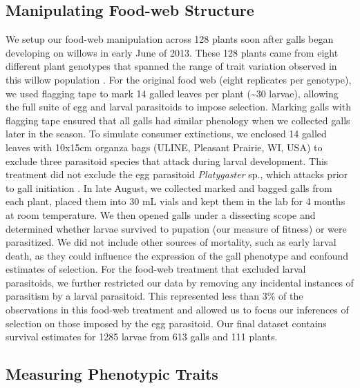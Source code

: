 \documentclass[11pt,]{article}
\begin{document}
\subsection{Manipulating Food-web
Structure}\label{manipulating-food-web-structure}

We setup our food-web manipulation across 128 plants soon after galls
began developing on willows in early June of 2013. These 128 plants came
from eight different plant genotypes that spanned the range of trait
variation observed in this willow population \citep{Barbour2015}. For
the original food web (eight replicates per genotype), we used flagging
tape to mark 14 galled leaves per plant (\textasciitilde{}30 larvae),
allowing the full suite of egg and larval parasitoids to impose
selection. Marking galls with flagging tape ensured that all galls had
similar phenology when we collected galls later in the season. To
simulate consumer extinctions, we enclosed 14 galled leaves with 10x15cm
organza bags (ULINE, Pleasant Prairie, WI, USA) to exclude three
parasitoid species that attack during larval development. This treatment
did not exclude the egg parasitoid \emph{Platygaster} sp., which attacks
prior to gall initiation \citep[larva initiate gall development in
Cecidomyiid midges:][]{Gagne1989}. In late August, we collected marked
and bagged galls from each plant, placed them into 30 mL vials and kept
them in the lab for 4 months at room temperature. We then opened galls
under a dissecting scope and determined whether larvae survived to
pupation (our measure of fitness) or were parasitized. We did not
include other sources of mortality, such as early larval death, as they
could influence the expression of the gall phenotype and confound
estimates of selection. For the food-web treatment that excluded larval
parasitoids, we further restricted our data by removing any incidental
instances of parasitism by a larval parasitoid. This represented less
than 3\% of the observations in this food-web treatment and allowed us
to focus our inferences of selection on those imposed by the egg
parasitoid. Our final dataset contains survival estimates for 1285
larvae from 613 galls and 111 plants.

\subsection{Measuring Phenotypic
Traits}\label{measuring-phenotypic-traits}
\end{document}
